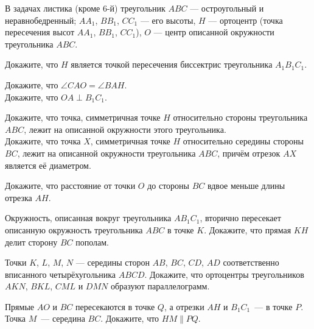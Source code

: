 \resetproblem \begingroup %
    \def\jeolmdate{19 октября 2018 г.}%
    \def\jeolmauthors{Доледёнок~А.\,В., Орлов~О.\,П.}%
\jeolmheader \endgroup


\noindent
В задачах листика (кроме $6$-й) треугольник $ABC$ --- остроугольный и неравнобедренный; $AA_1$, $BB_1$, $CC_1$ --- его высоты, $H$ --- ортоцентр (точка пересечения высот $AA_1$, $BB_1$, $CC_1$), $O$ --- центр описанной окружности треугольника $ABC$. \\

\begin{problems}

\item
Докажите, что $H$ является точкой пересечения биссектрис треугольника $A_1B_1C_1$.

\item
\subproblem
Докажите, что $\angle{CAO} = \angle{BAH}$. \\
\subproblem
Докажите, что $OA \perp B_1C_1$.

\item 
\subproblem 
Докажите, что точка, симметричная точке $H$ относительно стороны треугольника $ABC$, лежит на описанной окружности этого треугольника. \\ 
\subproblem
Докажите, что точка $X$, симметричная точке $H$ относительно середины стороны $BC$, лежит на описанной окружности треугольника $ABC$, причём отрезок $AX$ является её диаметром.

\item 
Докажите, что расстояние от точки $O$ до стороны $BC$ вдвое меньше длины отрезка $AH$.

\item
Окружность, описанная вокруг треугольника $AB_1C_1$, вторично пересекает описанную окружность треугольника $ABC$ в точке $K$. Докажите, что прямая $KH$ делит сторону $BC$ пополам.

\item
Точки $K$, $L$, $M$, $N$ --- середины сторон $AB$, $BC$, $CD$, $AD$ соответственно вписанного четырёхугольника $ABCD$. Докажите, что ортоцентры треугольников $AKN$, $BKL$, $CML$ и $DMN$ образуют параллелограмм.

\item
Прямые $AO$ и $BC$ пересекаются в точке $Q$, а отрезки $AH$ и $B_1C_1$~--- в точке $P$. Точка $M$~--- середина $BC$. Докажите, что $HM \parallel PQ$.

\end{problems}


